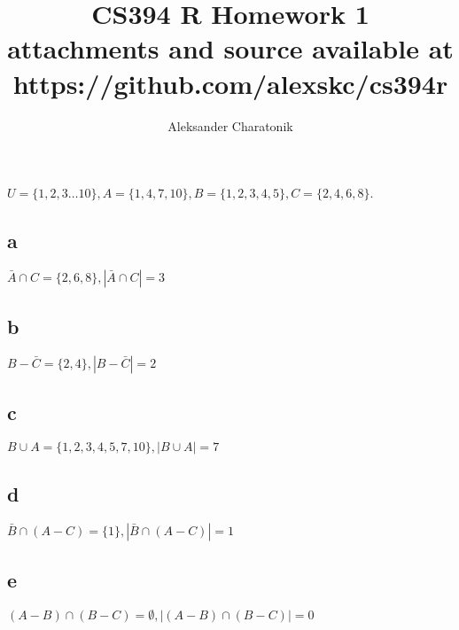 \documentclass[12pt]{article}
\title{CS394 R Homework 1\\
\large attachments and source available at https://github.com/alexskc/cs394r}
\author{Aleksander Charatonik}
\begin{document}
\maketitle

\section{}
\(U=\{1,2,3\dots 10\}, A=\{1,4,7,10\}, B=\{1,2,3,4,5\}, C=\{2,4,6,8\}\).\\
\subsection*{a}
\(\bar{A} \cap C = \{2,6,8\}, |\bar{A} \cap C| = 3\)
\subsection*{b}
\(B-\bar{C} = \{2,4\}, |B-\bar{C}| = 2\)
\subsection*{c}
\(B \cup A = \{1,2,3,4,5,7,10\}, |B \cup A| = 7\)
\subsection*{d}
\(\bar{B} \cap (A - C) = \{1\}, |\bar{B} \cap (A - C)| = 1\)
\subsection*{e}
\((A - B) \cap (B - C) = \emptyset, |(A - B) \cap (B - C)| = 0\)
\end{document}
